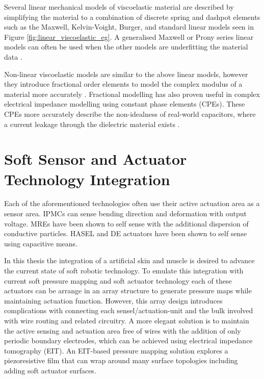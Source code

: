 Several linear mechanical models of viscoelastic material are described by simplifying the material to a combination of discrete spring and dashpot elements such as the Maxwell, Kelvin-Voight, Burger, and standard linear models seen in Figure \ref{fig:linear_viscoelastic_eg}. A generalised Maxwell or Prony series linear models can often be used when the other models are underfitting the material data \cite{Babaei2015,Tzikang2000}. 

Non-linear viscoelastic models are similar to the above linear models, however they introduce fractional order elements to model the complex modulus of a material more accurately \cite{Bonfanti2020}. Fractional modelling has also proven useful in complex electrical impedance modelling using constant phase elements (CPEs). These CPEs more accurately describe the non-idealness of real-world capacitors, where a current leakage through the dielectric material exists \cite{Vosika2013, Chang2022}.


\section{Soft Sensor and Actuator Technology Integration}


Each of the aforementioned technologies often use their active actuation area as a sensor area. IPMCs can sense bending direction and deformation with output voltage. MREs have been shown to self sense with the additional dispersion of conductive particles. HASEL and DE actuators have been shown to self sense using capacitive means. 

In this thesis the integration of a artificial skin and muscle is desired to advance the current state of soft robotic technology. To emulate this integration with current soft pressure mapping and soft actuator technology each of these actuators can be arrange in an array structure to generate pressure maps while maintaining actuation function. However, this array design introduces complications with connecting each sensel/actuation-unit and the bulk involved with wire routing and related circuitry. A more elegant solution is to maintain the active sensing and actuation area free of wires with the addition of only periodic boundary electrodes, which can be achieved using electrical impedance tomography (EIT). An EIT-based pressure mapping solution explores a piezoresistive film that can wrap around many surface topologies including adding soft actuator surfaces.

